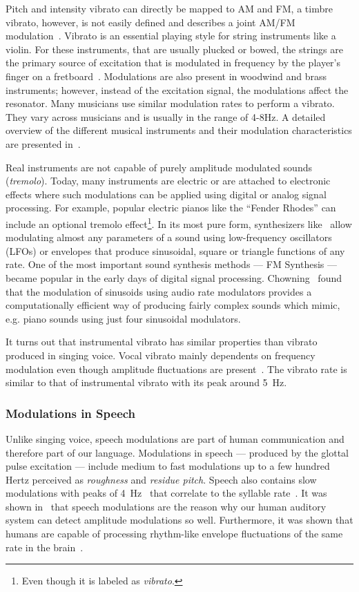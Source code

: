 Pitch and intensity vibrato can directly be mapped to AM and FM, a timbre vibrato, however, is not easily defined and describes a joint AM/FM modulation~\cite{desain99}.
Vibrato is an essential playing style for string instruments like a violin. 
For these instruments, that are usually plucked or bowed, the strings are the primary source of excitation that is modulated in frequency by the player's finger on a fretboard~\cite{macleod06}.
Modulations are also present in woodwind and brass instruments; however, instead of the excitation signal, the modulations affect the resonator.
Many musicians use similar modulation rates to perform a vibrato.
They vary across musicians and is usually in the range of 4-8\si{\hertz}.
A detailed overview of the different musical instruments and their modulation characteristics are presented in~\cite{fletcher01}.
\par
Real instruments are not capable of purely amplitude modulated sounds (\emph{tremolo}). 
Today, many instruments are electric or are attached to electronic effects where such modulations can be applied using digital or analog signal processing.
For example, popular electric pianos like the ``Fender Rhodes'' can include an optional tremolo effect\footnote{Even though it is labeled as \emph{vibrato}.}.
In its most pure form, synthesizers like~\cite{pinch09, buchla05} allow modulating almost any parameters of a sound using low-frequency oscillators (LFOs) or envelopes that produce sinusoidal, square or triangle functions of any rate.
One of the most important sound synthesis methods --- FM Synthesis --- became popular in the early days of digital signal processing. 
Chowning~\cite{chowning73} found that the modulation of sinusoids using audio rate modulators provides a computationally efficient way of producing fairly complex sounds which mimic, e.g. piano sounds using just four sinusoidal modulators.
\par
It turns out that instrumental vibrato has similar properties than vibrato produced in singing voice.
Vocal vibrato mainly dependents on frequency modulation even though amplitude fluctuations are present~\cite{sundberg94}. 
The vibrato rate is similar to that of instrumental vibrato with its peak around 5~\si{\hertz}.

\subsubsection*{Modulations in Speech}

Unlike singing voice, speech modulations are part of human communication and therefore part of our language.
Modulations in speech --- produced by the glottal pulse excitation ---   include medium to fast modulations up to a few hundred Hertz perceived as \emph{roughness} and \emph{residue pitch}.
Speech also contains slow modulations with peaks of 4~\si{\hertz}~\cite{greenberg97, fuellgrabe09} that correlate to the syllable rate~\cite{plomp83, houtgast85}.
It was shown in~\cite{joris04} that speech modulations are the reason why our human auditory system can detect amplitude modulations so well.
Furthermore, it was shown that humans are capable of processing rhythm-like envelope fluctuations of the same rate in the brain~\cite{schreiner88, plomp83}.

